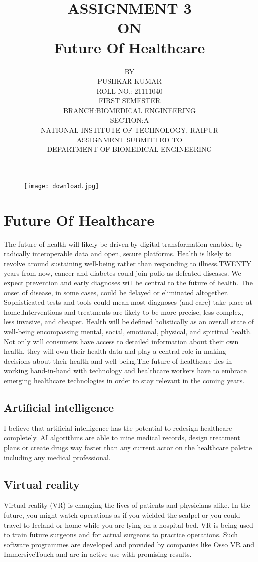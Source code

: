 \documentclass{article}
\title{ASSIGNMENT 3\\ON\\ Future Of Healthcare}
\author{BY\\PUSHKAR KUMAR\\ROLL NO.: 21111040\\FIRST SEMESTER\\BRANCH:BIOMEDICAL ENGINEERING\\SECTION:A\\NATIONAL INSTITUTE OF TECHNOLOGY, RAIPUR\\ASSIGNMENT SUBMITTED TO\\
DEPARTMENT OF BIOMEDICAL ENGINEERING}
\date{}
\begin{document}
\maketitle
\begin{figure}[h]
    \centering
    \texttt{[image: download.jpg]}
\end{figure}


\section{Future Of Healthcare}
The future of health will likely be driven by digital transformation enabled by radically interoperable data and open, secure platforms. Health is likely to revolve around sustaining well-being rather than responding to illness.TWENTY years from now, cancer and diabetes could join polio as defeated diseases. We expect prevention and early diagnoses will be central to the future of health. The onset of disease, in some cases, could be delayed or eliminated altogether. Sophisticated tests and tools could mean most diagnoses (and care) take place at home.Interventions and treatments are likely to be more precise, less complex, less invasive, and cheaper. Health will be defined holistically as an overall state of well-being encompassing mental, social, emotional, physical, and spiritual health. Not only will consumers have access to detailed information about their own health, they will own their health data and play a central role in making decisions about their health and well-being.The future of healthcare lies in working hand-in-hand with technology and healthcare workers have to embrace emerging healthcare technologies in order to stay relevant in the coming years.
\subsection{ Artificial intelligence}
I believe that artificial intelligence has the potential to redesign healthcare completely. AI algorithms are able to mine medical records, design treatment plans or create drugs way faster than any current actor on the healthcare palette including any medical professional. 
\subsection{Virtual reality}
Virtual reality (VR) is changing the lives of patients and physicians alike. In the future, you might watch operations as if you wielded the scalpel or you could travel to Iceland or home while you are lying on a hospital bed. VR is being used to train future surgeons and for actual surgeons to practice operations. Such software programmes are developed and provided by companies like Osso VR and ImmersiveTouch and are in active use with promising results. 
\end{document}
